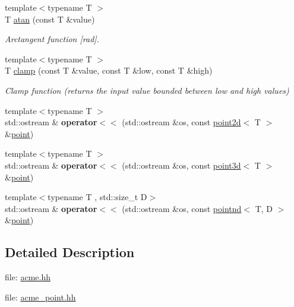 \begin{DoxyCompactItemize}
{\footnotesize template$<$typename T $>$ }\\T \hyperlink{namespaceacme_ab9d8ecb26b9bc01ea9e8906489d709bf}{atan} (const T \&value)
\begin{DoxyCompactList}\small\item\em Arctangent function \mbox{[}rad\mbox{]}. \end{DoxyCompactList}\item 
{\footnotesize template$<$typename T $>$ }\\T \hyperlink{namespaceacme_a51ac298ca5ccfff9b9d71bfed9253131}{clamp} (const T \&value, const T \&low, const T \&high)
\begin{DoxyCompactList}\small\item\em Clamp function (returns the input value bounded between low and high values) \end{DoxyCompactList}\item 
\mbox{\label{namespaceacme_ad995016916bb6f796ddf7a174879e8d8}} 
{\footnotesize template$<$typename T $>$ }\\std\+::ostream \& {\bfseries operator$<$$<$} (std\+::ostream \&os, const \hyperlink{classacme_1_1point2d}{point2d}$<$ T $>$ \&\hyperlink{classacme_1_1point}{point})
\item 
\mbox{\label{namespaceacme_a7d1407d3553a741425be41161b98ea99}} 
{\footnotesize template$<$typename T $>$ }\\std\+::ostream \& {\bfseries operator$<$$<$} (std\+::ostream \&os, const \hyperlink{classacme_1_1point3d}{point3d}$<$ T $>$ \&\hyperlink{classacme_1_1point}{point})
\item 
\mbox{\label{namespaceacme_a3190cea3db0f59885cfb2b62ec1b972a}} 
{\footnotesize template$<$typename T , std\+::size\+\_\+t D$>$ }\\std\+::ostream \& {\bfseries operator$<$$<$} (std\+::ostream \&os, const \hyperlink{classacme_1_1pointnd}{pointnd}$<$ T, D $>$ \&\hyperlink{classacme_1_1point}{point})
\end{DoxyCompactItemize}


\subsection{Detailed Description}
file\+: \hyperlink{acme_8hh_source}{acme.\+hh}

file\+: \hyperlink{acme__point_8hh_source}{acme\+\_\+point.\+hh} 

